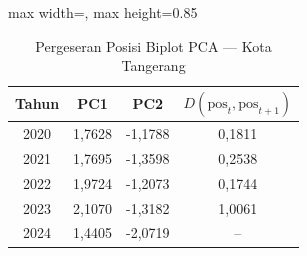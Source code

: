 \begin{table}[H]
\centering
\caption{Pergeseran Posisi Biplot PCA --- Kota Tangerang} \label{tab:appjarak_pca_skor_kota_tangerang}
\begin{adjustbox}{max width=\textwidth, max height=0.85\textheight}
\begin{tabular}{|c|c|c|c|}
\hline
\textbf{Tahun} & \textbf{PC1} & \textbf{PC2} & \textbf{$D(\text{pos}_t, \text{pos}_{t+1})$} \\
\hline
2020 & 1,7628 & -1,1788 & 0,1811 \\
2021 & 1,7695 & -1,3598 & 0,2538 \\
2022 & 1,9724 & -1,2073 & 0,1744 \\
2023 & 2,1070 & -1,3182 & 1,0061 \\
2024 & 1,4405 & -2,0719 & -- \\
\hline
\end{tabular}
\end{adjustbox}
\end{table}